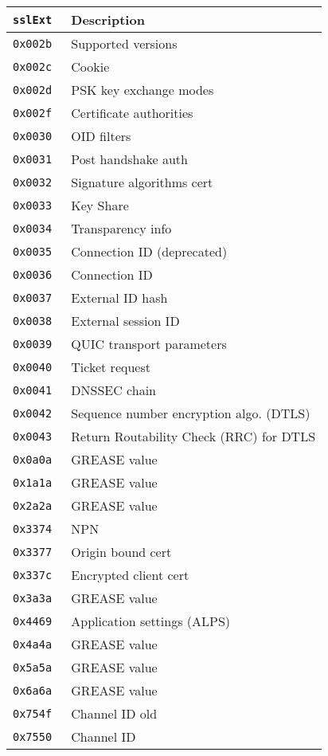 \documentclass[documentation]{subfiles}
\begin{document}
\begin{minipage}{.48\textwidth}
    \begin{longtable}{>{\tt}rl}
        \toprule
        {\bf sslExt} & {\bf Description}\\
        \midrule\endhead%
        0x002b & Supported versions\\
        0x002c & Cookie\\
        0x002d & PSK key exchange modes\\
        0x002f & Certificate authorities\\
        0x0030 & OID filters\\
        0x0031 & Post handshake auth\\
        0x0032 & Signature algorithms cert\\
        0x0033 & Key Share\\
        0x0034 & Transparency info\\
        0x0035 & Connection ID (deprecated)\\
        0x0036 & Connection ID\\
        0x0037 & External ID hash\\
        0x0038 & External session ID\\
        0x0039 & QUIC transport parameters\\
        0x0040 & Ticket request\\
        0x0041 & DNSSEC chain\\
        0x0042 & Sequence number encryption algo. (DTLS)\\
        0x0043 & Return Routability Check (RRC) for DTLS\\
        0x0a0a & GREASE value\\
        0x1a1a & GREASE value\\
        0x2a2a & GREASE value\\
        0x3374 & NPN\\
        0x3377 & Origin bound cert\\
        0x337c & Encrypted client cert\\
        0x3a3a & GREASE value\\
        0x4469 & Application settings (ALPS)\\
        0x4a4a & GREASE value\\
        0x5a5a & GREASE value\\
        0x6a6a & GREASE value\\
        0x754f & Channel ID old\\
        0x7550 & Channel ID\\

\end{longtable}
\end{minipage}
\end{document}
